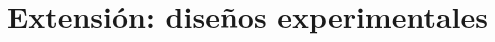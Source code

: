 \documentclass[12pt]{article}
\begin{document}

\section{Extensión: diseños experimentales}

\end{document}
